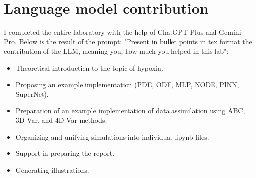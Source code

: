 \documentclass{article}
\begin{document}
\section{Language model contribution}
I completed the entire laboratory with the help of ChatGPT Plus and Gemini Pro. Below is the result of the prompt: "Present in bullet points in tex format the contribution of the LLM, meaning you, how much you helped in this lab":
\begin{itemize}
    \item Theoretical introduction to the topic of hypoxia.
    \item Proposing an example implementation (PDE, ODE, MLP, NODE, PINN, SuperNet).
    \item Preparation of an example implementation of data assimilation using ABC, 3D-Var, and 4D-Var methods.
    \item Organizing and unifying simulations into individual .ipynb files.
    \item Support in preparing the report.
    \item Generating illustrations.
\end{itemize}
\end{document}
